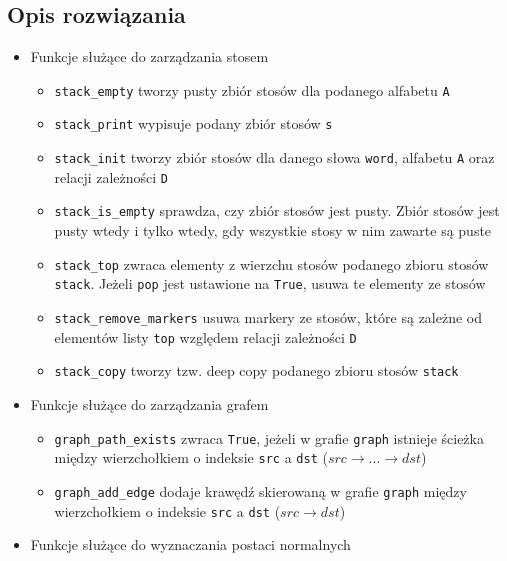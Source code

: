 \documentclass[11pt]{article}
\providecommand{\tightlist}{%
      \setlength{\itemsep}{0pt}\setlength{\parskip}{0pt}}
\begin{document}
    \hypertarget{opis-rozwiux105zania}{%
\subsection{Opis rozwiązania}\label{opis-rozwiux105zania}}

\begin{itemize}
\item
  Funkcje służące do zarządzania stosem

  \begin{itemize}
  \tightlist
  \item
    \texttt{stack\_empty} tworzy pusty zbiór stosów dla podanego
    alfabetu \texttt{A}
  \item
    \texttt{stack\_print} wypisuje podany zbiór stosów \texttt{s}
  \item
    \texttt{stack\_init} tworzy zbiór stosów dla danego słowa
    \texttt{word}, alfabetu \texttt{A} oraz relacji zależności
    \texttt{D}
  \item
    \texttt{stack\_is\_empty} sprawdza, czy zbiór stosów jest pusty.
    Zbiór stosów jest pusty wtedy i tylko wtedy, gdy wszystkie stosy w
    nim zawarte są puste
  \item
    \texttt{stack\_top} zwraca elementy z wierzchu stosów podanego
    zbioru stosów \texttt{stack}. Jeżeli \texttt{pop} jest ustawione na
    \texttt{True}, usuwa te elementy ze stosów
  \item
    \texttt{stack\_remove\_markers} usuwa markery ze stosów, które są
    zależne od elementów listy \texttt{top} względem relacji zależności
    \texttt{D}
  \item
    \texttt{stack\_copy} tworzy tzw. deep copy podanego zbioru stosów
    \texttt{stack}
  \end{itemize}
\item
  Funkcje służące do zarządzania grafem

  \begin{itemize}
  \tightlist
  \item
    \texttt{graph\_path\_exists} zwraca \texttt{True}, jeżeli w grafie
    \texttt{graph} istnieje ścieżka między wierzchołkiem o indeksie
    \texttt{src} a \texttt{dst}
    (\(src \rightarrow ... \rightarrow dst\))
  \item
    \texttt{graph\_add\_edge} dodaje krawędź skierowaną w grafie
    \texttt{graph} między wierzchołkiem o indeksie \texttt{src} a
    \texttt{dst} (\(src \rightarrow dst\))
  \end{itemize}
\item
  Funkcje służące do wyznaczania postaci normalnych


\end{itemize}
\end{document}
